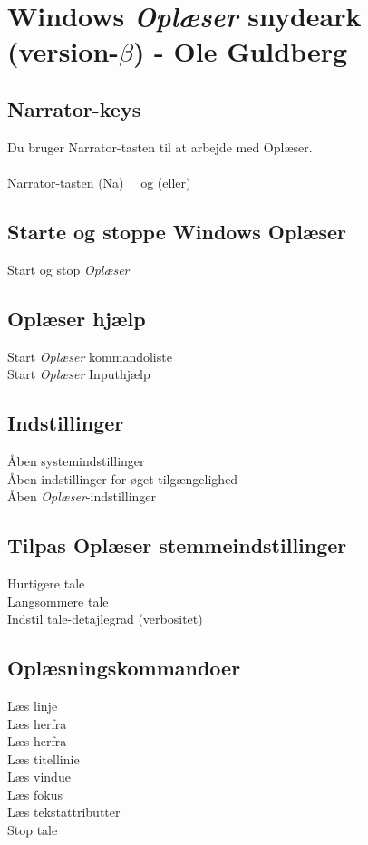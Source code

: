 \documentclass[a4paper, landscape, 11pt]{scrartcl}
\newcommand{\command}[2]{#1~\dotfill{}~#2\\} %
\begin{document}
\section*{Windows \emph{Oplæser} snydeark (version-$\beta$) - Ole Guldberg}

\hrulefill{}

\begin{multicols}{2}

\subsection*{Narrator-keys}
Du bruger Narrator-tasten til at arbejde med Oplæser. 
\\ \\
\command{Narrator-tasten (Na)}{ og (eller) \keys{Insert}}

\subsection*{Starte og stoppe Windows Oplæser}
\command{Start og stop \emph{Oplæser}}{\keys{\faWindows + \ctrl + \enter}}

\subsection*{Oplæser hjælp}
\command{Start \emph{Oplæser} kommandoliste}{}
\command{Start \emph{Oplæser} Inputhjælp}{}

\subsection*{Indstillinger}
\command{Åben systemindstillinger}{}
\command{Åben indstillinger for øget tilgængelighed}{\keys{\faWindows + u}}
\command{Åben \emph{Oplæser}-indstillinger}{\keys{\faWindows + \ctrl + n}}


\subsection*{Tilpas Oplæser stemmeindstillinger}
\command{Hurtigere tale}{}
\command{Langsommere tale}{}
\command{Indstil tale-detajlegrad (verbositet)}{}

\subsection*{Oplæsningskommandoer}
\command{Læs linje}{}
\command{Læs herfra}{}
\command{Læs herfra}{}
\command{Læs titellinie}{}
\command{Læs vindue}{}
\command{Læs fokus}{}
\command{Læs tekstattributter}{}
\command{Stop tale}{\keys{\ctrl}}


\end{multicols}
\end{document}
